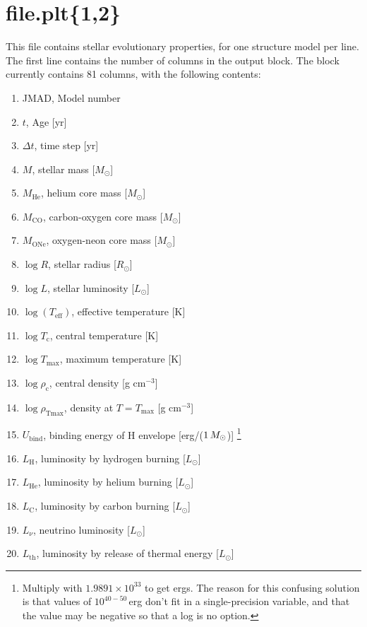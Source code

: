 \section{file.plt\{1,2\}}
\label{sec:plt}

This file contains stellar evolutionary properties, for one structure model
per line.  The first line contains the number of columns in the output block.
The block currently contains 81 columns, with the following contents:

\begin{enumerate}
\item JMAD, Model number
\item $t$, Age [yr] 
\item $\Delta t$, time step [yr] 
  
\item $M$, stellar mass [$M_\odot$]
\item $M_\mathrm{He}$, helium core mass [$M_\odot$] 
\item $M_\mathrm{CO}$, carbon-oxygen core mass [$M_\odot$]  
\item $M_\mathrm{ONe}$, oxygen-neon core mass [$M_\odot$]  
  
\item $\log R$, stellar radius [$R_\odot$]
\item $\log L$, stellar luminosity [$L_\odot$] 
\item $\log(T_\mathrm{eff})$, effective temperature [K] 
\item $\log T_\mathrm{c}$, central temperature [K]
\item $\log T_\mathrm{max}$, maximum temperature [K]
\item $\log \rho_\mathrm{c}$, central density [g cm$^{-3}$] 
\item $\log \rho_\mathrm{Tmax}$, density at $T=T_\mathrm{max}$ [g cm$^{-3}$] 
\item $U_\mathrm{bind}$, binding energy of H envelope [erg/($1\,M_\odot$)] \footnote{Multiply with $1.9891\times10^{33}$ to get ergs. The reason for this confusing solution is that values of $10^{40-50}$\,erg don't fit in a single-precision variable, and that the value may be negative so that a log is no option.\label{fn:be}}

\item $L_\mathrm{H}$, luminosity by hydrogen burning [$L_\odot$]
\item $L_\mathrm{He}$, luminosity by helium burning [$L_\odot$]
\item $L_\mathrm{C}$, luminosity by carbon burning [$L_\odot$]
\item $L_\nu$, neutrino luminosity [$L_\odot$]
\item $L_\mathrm{th}$, luminosity by release of thermal energy [$L_\odot$]


\end{enumerate}
